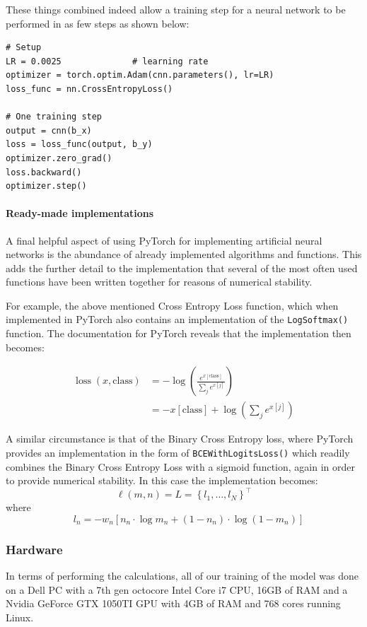 \begin{multicols}{2}
These things combined indeed allow a training step for a neural network to be performed in as few steps as shown below:
\begin{lstlisting}
# Setup
LR = 0.0025              # learning rate
optimizer = torch.optim.Adam(cnn.parameters(), lr=LR)
loss_func = nn.CrossEntropyLoss()

# One training step
output = cnn(b_x)
loss = loss_func(output, b_y)
optimizer.zero_grad()
loss.backward()
optimizer.step()
\end{lstlisting}

\paragraph{Ready-made implementations}
A final helpful aspect of using PyTorch for implementing artificial neural networks is the abundance of already implemented algorithms and functions. This adds the further detail to the implementation that several of the most often used functions have been written together for reasons of numerical stability. 

For example, the above mentioned Cross Entropy Loss function, which when implemented in PyTorch also contains an implementation of the \texttt{LogSoftmax()} function. The documentation for PyTorch reveals that the implementation then becomes:

\begin{align*}
\operatorname{loss}(x, \text {class})&=-\log \left(\frac{e^{ x[\text {class}]}}{\sum_{j} e^{ x[j]}}\right)\\
&=-x[\text {class}]+\log \left(\sum_{j} e^{x[j]}\right)
\end{align*}

\noindent A similar circumstance is that of the Binary Cross Entropy loss, where PyTorch provides an implementation in the form of \texttt{BCEWithLogitsLoss()} which readily combines the Binary Cross Entropy Loss with a sigmoid function, again in order to provide numerical stability. In this case the implementation becomes: \\
\[
\ell(m, n)=L=\left\{l_{1}, \ldots, l_{N}\right\}^{\top}
\]
where
\[ \quad l_{n}=-w_{n}\left[n_{n} \cdot \log m_{n}+\left(1-n_{n}\right) \cdot \log \left(1-m_{n}\right)\right]
\]

\subsubsection{Hardware}
In terms of performing the calculations, all of our training of the model was done on a Dell PC with a 7th gen octocore Intel Core i7 CPU, 16GB of RAM and a Nvidia GeForce GTX 1050TI GPU with 4GB of RAM and 768 cores running Linux.


\end{multicols}
